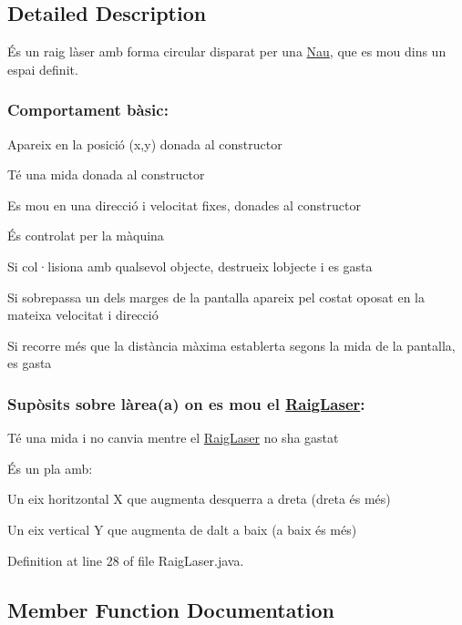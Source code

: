 \subsection{Detailed Description}
És un raig làser amb forma circular disparat per una \hyperlink{class_nau}{Nau}, que es mou dins un espai definit. 

\subsubsection*{Comportament bàsic\+: }


\begin{DoxyItemize}
\item Apareix en la posició (x,y) donada al constructor
\item Té una mida donada al constructor
\item Es mou en una direcció i velocitat fixes, donades al constructor
\item És controlat per la màquina
\item Si col·lisiona amb qualsevol objecte, destrueix l\textquotesingle{}objecte i es gasta
\item Si sobrepassa un dels marges de la pantalla apareix pel costat oposat en la mateixa velocitat i direcció
\item Si recorre més que la distància màxima establerta segons la mida de la pantalla, es gasta
\end{DoxyItemize}

\subsubsection*{Supòsits sobre l\textquotesingle{}àrea(a) on es mou el \hyperlink{class_raig_laser}{Raig\+Laser}\+: }

Té una mida i no canvia mentre el \hyperlink{class_raig_laser}{Raig\+Laser} no s\textquotesingle{}ha gastat

És un pla amb\+:
\begin{DoxyItemize}
\item Un eix horitzontal X que augmenta d\textquotesingle{}esquerra a dreta (dreta és més)
\item Un eix vertical Y que augmenta de dalt a baix (a baix és més) 
\end{DoxyItemize}

Definition at line 28 of file Raig\+Laser.\+java.



\subsection{Member Function Documentation}
\hypertarget{class_raig_laser_ac5b68f8063e239ae947a7ed728614799}{}
